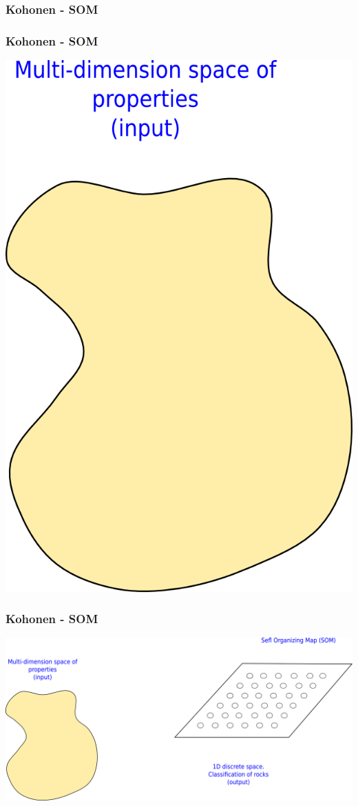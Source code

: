 \documentclass[aspectratio=10]{beamer} %
\begin{document}
\subsubsection{Kohonen - SOM}


\begin{frame}
  \frametitle{Kohonen - SOM}
  	 \includegraphics[scale=0.5]{Imagens/Introkoho1.png} 
\end{frame}


\begin{frame}
 \frametitle{Kohonen - SOM}
 \includegraphics[scale=0.5]{Imagens/Introkoho2.png} 
\end{frame}
\end{document}
